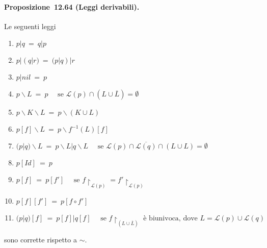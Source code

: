 \documentclass[a4paper,twosides]{report}
\begin{document}
\paragraph{Proposizione~12.64 (Leggi derivabili).} Le seguenti leggi
\begin{enumerate}
\item $p|q\ =\ q|p$
\item $p|(q|r)\ =\ (p|q)|r$
\item $p|nil\ =\ p$
\item $p \backslash L \ =\  p\quad\text{ se }\mathcal{L}(p) \cap (L \cup \overline{L}) = \emptyset$
\item $p \backslash K \backslash L \ =\  p \backslash (K \cup L)$
\item $p[f] \backslash L \ =\  p \backslash f^{-1} (L)[f]$
\item $(p|q) \backslash L \ =\  p \backslash L|q \backslash L\quad\text{ se }\mathcal{L}(p) \cap \overline{\mathcal{L}(q)} \cap (L \cup L) = \emptyset$
\item $p[Id] \ =\  p$
\item $p[f] \ =\  p[f']\quad\text{ se }f \upharpoonright_{\mathcal{L}(p)} = f'\upharpoonright_{\mathcal{L}(p)}$
\item $p[f][f'] \ =\  p[f \circ f']$
\item $(p|q)[f] \ =\  p[f]|q[f]\quad\text{ se }f \upharpoonright_{(L \cup \overline{L})}\text{ è biunivoca, dove }L = \mathcal{L}(p) \cup \mathcal{L}(q)$
\end{enumerate}
sono corrette rispetto a $\sim$.
\end{document}
